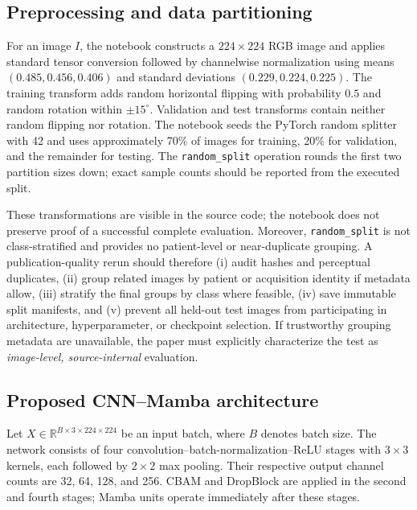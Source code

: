 \documentclass[11pt,a4paper]{article}
\begin{document}
\subsection{Preprocessing and data partitioning}\label{subsec:prep}
For an image $I$, the notebook constructs a $224\times224$ RGB image and applies standard tensor conversion followed by channelwise normalization using means $(0.485,0.456,0.406)$ and standard deviations $(0.229,0.224,0.225)$. The training transform adds random horizontal flipping with probability $0.5$ and random rotation within $\pm15^\circ$. Validation and test transforms contain neither random flipping nor rotation. The notebook seeds the PyTorch random splitter with 42 and uses approximately 70\% of images for training, 20\% for validation, and the remainder for testing. The \texttt{random\_split} operation rounds the first two partition sizes down; exact sample counts should be reported from the executed split.

These transformations are visible in the source code; the notebook does not preserve proof of a successful complete evaluation. Moreover, \texttt{random\_split} is not class-stratified and provides no patient-level or near-duplicate grouping. A publication-quality rerun should therefore (i) audit hashes and perceptual duplicates, (ii) group related images by patient or acquisition identity if metadata allow, (iii) stratify the final groups by class where feasible, (iv) save immutable split manifests, and (v) prevent all held-out test images from participating in architecture, hyperparameter, or checkpoint selection. If trustworthy grouping metadata are unavailable, the paper must explicitly characterize the test as \emph{image-level, source-internal} evaluation.

\subsection{Proposed CNN--Mamba architecture}\label{subsec:arch}
Let $X\in\mathbb{R}^{B\times3\times224\times224}$ be an input batch, where $B$ denotes batch size. The network consists of four convolution--batch-normalization--ReLU stages with $3\times3$ kernels, each followed by $2\times2$ max pooling. Their respective output channel counts are 32, 64, 128, and 256. CBAM and DropBlock are applied in the second and fourth stages; Mamba units operate immediately after these stages.
\end{document}
